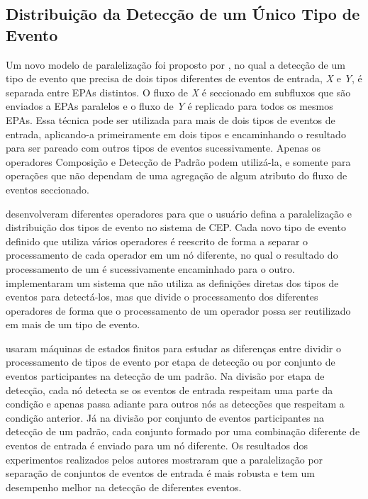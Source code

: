 \subsection{{Distribuição da Detecção de um Único Tipo de Evento}}
\label{sec:singleEvent}

Um novo modelo de paralelização foi proposto por \cite{doi:10.1177/1550147717728626}, no qual a detecção de um tipo de evento que precisa de dois tipos diferentes de eventos de entrada, \textit{X} e \textit{Y}, é separada entre EPAs distintos. O fluxo de \textit{X} é seccionado em subfluxos que são enviados a EPAs paralelos e o fluxo de \textit{Y} é replicado para todos os mesmos EPAs. Essa técnica pode ser utilizada para mais de dois tipos de eventos de entrada, aplicando-a primeiramente em dois tipos e encaminhando o resultado para ser pareado com outros tipos de eventos sucessivamente. Apenas os operadores Composição e Detecção de Padrão podem utilizá-la, e somente para operações que não dependam de uma agregação de algum atributo do fluxo de eventos seccionado.




\cite{JAYASEKARA201542} desenvolveram diferentes operadores para que o usuário defina a paralelização e distribuição dos tipos de evento no sistema de CEP. Cada novo tipo de evento definido que utiliza vários operadores é reescrito de forma a separar o processamento de cada operador em um nó diferente, no qual o resultado do processamento de um é sucessivamente encaminhado para o outro. \cite{Schultz-Moller:2009:DCE:1619258.1619264} implementaram um sistema que não utiliza as definições diretas dos tipos de eventos para detectá-los, mas que divide o processamento dos diferentes operadores de forma que o processamento de um operador possa ser reutilizado em mais de um tipo de evento. 

\cite{Balkesen:2013:RRI:2488222.2488257} usaram máquinas de estados finitos para estudar as diferenças entre dividir o processamento de tipos de evento por etapa de detecção ou por conjunto de eventos participantes na detecção de um padrão. Na divisão por etapa de detecção, cada nó detecta se os eventos de entrada respeitam uma parte da condição e apenas passa adiante para outros nós as detecções que respeitam a condição anterior. Já na divisão por conjunto de eventos participantes na detecção de um padrão, cada conjunto formado por uma combinação diferente de eventos de entrada é enviado para um nó diferente. Os resultados dos experimentos realizados pelos autores  mostraram que a paralelização por separação de conjuntos de eventos de entrada é mais robusta e tem um desempenho melhor na detecção de diferentes eventos. 

